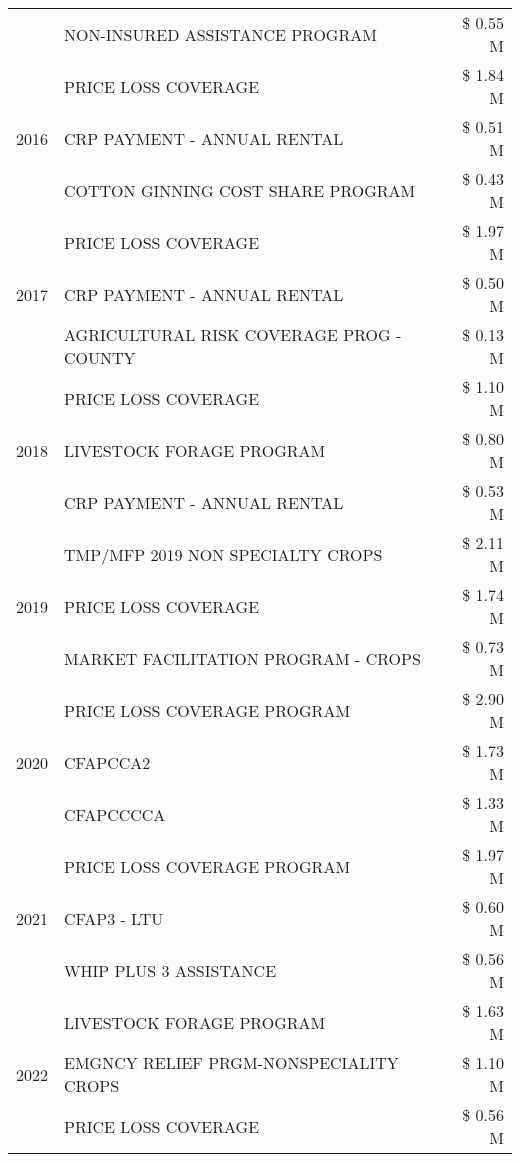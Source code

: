 \begin{tabular}{llr}
 & NON-INSURED ASSISTANCE PROGRAM & \$ 0.55 M \\
\cline{1-3}
\multirow[t]{3}{*}{2016} & PRICE LOSS COVERAGE & \$ 1.84 M \\
 & CRP PAYMENT - ANNUAL RENTAL & \$ 0.51 M \\
 & COTTON GINNING COST SHARE PROGRAM & \$ 0.43 M \\
\cline{1-3}
\multirow[t]{3}{*}{2017} & PRICE LOSS COVERAGE & \$ 1.97 M \\
 & CRP PAYMENT - ANNUAL RENTAL & \$ 0.50 M \\
 & AGRICULTURAL RISK COVERAGE PROG - COUNTY & \$ 0.13 M \\
\cline{1-3}
\multirow[t]{3}{*}{2018} & PRICE LOSS COVERAGE & \$ 1.10 M \\
 & LIVESTOCK FORAGE PROGRAM & \$ 0.80 M \\
 & CRP PAYMENT - ANNUAL RENTAL & \$ 0.53 M \\
\cline{1-3}
\multirow[t]{3}{*}{2019} & TMP/MFP 2019 NON SPECIALTY CROPS & \$ 2.11 M \\
 & PRICE LOSS COVERAGE & \$ 1.74 M \\
 & MARKET FACILITATION PROGRAM - CROPS & \$ 0.73 M \\
\cline{1-3}
\multirow[t]{3}{*}{2020} & PRICE LOSS COVERAGE PROGRAM & \$ 2.90 M \\
 & CFAPCCA2 & \$ 1.73 M \\
 & CFAPCCCCA & \$ 1.33 M \\
\cline{1-3}
\multirow[t]{3}{*}{2021} & PRICE LOSS COVERAGE PROGRAM & \$ 1.97 M \\
 & CFAP3 - LTU & \$ 0.60 M \\
 & WHIP PLUS 3 ASSISTANCE & \$ 0.56 M \\
\cline{1-3}
\multirow[t]{3}{*}{2022} & LIVESTOCK FORAGE PROGRAM & \$ 1.63 M \\
 & EMGNCY RELIEF PRGM-NONSPECIALITY CROPS & \$ 1.10 M \\
 & PRICE LOSS COVERAGE & \$ 0.56 M \\
\cline{1-3}
\bottomrule
\end{tabular}
